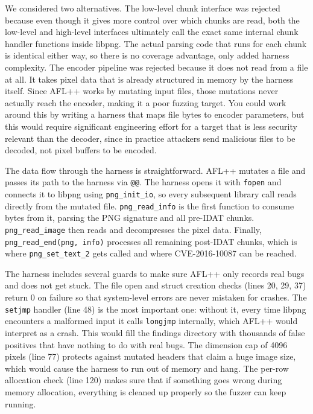 \documentclass[letterpaper,twocolumn,10pt]{article}
\begin{document}
We considered two alternatives. The low-level chunk interface was rejected because even though it gives more control over which chunks are read, both the low-level and high-level interfaces ultimately call the exact same internal chunk handler functions inside libpng. The actual parsing code that runs for each chunk is identical either way, so there is no coverage advantage, only added harness complexity. The encoder pipeline was rejected because it does not read from a file at all. It takes pixel data that is already structured in memory by the harness itself. Since AFL++ works by mutating input files, those mutations never actually reach the encoder, making it a poor fuzzing target. You could work around this by writing a harness that maps file bytes to encoder parameters, but this would require significant engineering effort for a target that is less security relevant than the decoder, since in practice attackers send malicious files to be decoded, not pixel buffers to be encoded.

The data flow through the harness is straightforward. AFL++ mutates a file and passes its path to the harness via \texttt{@@}. The harness opens it with \texttt{fopen} and connects it to libpng using \texttt{png\_init\_io}, so every subsequent library call reads directly from the mutated file. \texttt{png\_read\_info} is the first function to consume bytes from it, parsing the PNG signature and all pre-IDAT chunks. \texttt{png\_read\_image} then reads and decompresses the pixel data. Finally, \texttt{png\_read\_end(png, info)} processes all remaining post-IDAT chunks, which is where \texttt{png\_set\_text\_2} gets called and where CVE-2016-10087 can be reached.

The harness includes several guards to make sure AFL++ only records real bugs and does not get stuck. The file open and struct creation checks (lines 20, 29, 37) return 0 on failure so that system-level errors are never mistaken for crashes. The \texttt{setjmp} handler (line 48) is the most important one: without it, every time libpng encounters a malformed input it calls \texttt{longjmp} internally, which AFL++ would interpret as a crash. This would fill the findings directory with thousands of false positives that have nothing to do with real bugs. The dimension cap of 4096 pixels (line 77) protects against mutated headers that claim a huge image size, which would cause the harness to run out of memory and hang. The per-row allocation check (line 120) makes sure that if something goes wrong during memory allocation, everything is cleaned up properly so the fuzzer can keep running.
\end{document}
